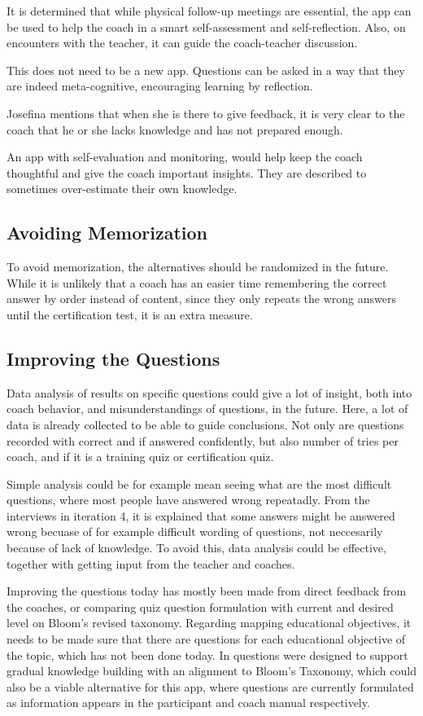 It is determined that while physical follow-up meetings are essential, the app can be used to help the coach in a smart self-assessment and self-reflection. Also, on encounters with the teacher, it can guide the coach-teacher discussion.

This does not need to be a new app. Questions can be asked in a way that they are indeed meta-cognitive, encouraging learning by reflection.

Josefina mentions that when she is there to give feedback, it is very clear to the coach that he or she lacks knowledge and has not prepared enough.

An app with self-evaluation and monitoring, would help keep the coach thoughtful and give the coach important insights. They are described to sometimes over-estimate their own knowledge.

\subsection{Avoiding Memorization}
To avoid memorization, the alternatives should be randomized in the future. While it is unlikely that a coach has an easier time remembering the correct answer by order instead of content, since they only repeats the wrong answers until the certification test, it is an extra measure.

\subsection{Improving the Questions}
Data analysis of results on specific questions could give a lot of insight, both into coach behavior, and misunderstandings of questions, in the future. Here, a lot of data is already collected to be able to guide conclusions. Not only are questions recorded with correct and if answered confidently, but also number of tries per coach, and if it is a training quiz or certification quiz.

Simple analysis could be for example mean seeing what are the most difficult questions, where most people have answered wrong repeatadly. From the interviews in iteration 4, it is explained that some answers might be answered wrong becuase of for example difficult wording of questions, not neccesarily because of lack of knowledge. To avoid this, data analysis could be effective, together with getting input from the teacher and coaches.

Improving the questions today has mostly been made from direct feedback from the coaches, or comparing quiz question formulation with current and desired level on Bloom's revised taxonomy. Regarding mapping educational objectives, it needs to be made sure that there are questions for each educational objective of the topic, which has not been done today. In \cite{yengin} questions were designed to support gradual knowledge building with an alignment to Bloom’s Taxonomy, which could also be a viable alternative for this app, where questions are currently formulated as information appears in the participant and coach manual respectively.
